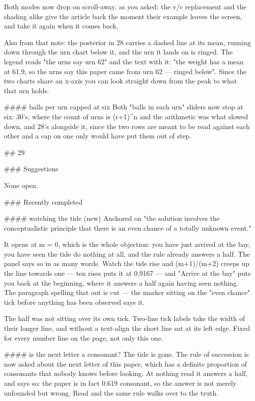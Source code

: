 Both modes now drop on scroll-away, as you asked: the v/c replacement and the
shading alike give the article back the moment their example leaves the screen,
and take it again when it comes back.

Also from that note: the posterior in 28 carries a dashed line at its mean,
running down through the urn chart below it, and the urn it lands on is ringed.
The legend reads "the urns say urn 62" and the text with it: "the weight has a
mean at 61.9, so the urns say this paper came from urn 62 — ringed below". Since
the two charts share an x-axis you can look straight down from the peak to what
that urn holds.

#### balls per urn capped at six
Both "balls in each urn" sliders now stop at six: 30's, where the count of urns
is (r+1)^n and the arithmetic was what slowed down, and 28's alongside it, since
the two rows are meant to be read against each other and a cap on one only would
have put them out of step.


## 29

### Suggestions

None open.

### Recently completed

#### watching the tide (new)
Anchored on "the solution involves the conceptualistic principle that there is
an even chance of a totally unknown event."

It opens at m = 0, which is the whole objection: you have just arrived at the
bay, you have seen the tide do nothing at all, and the rule already answers a
half. The panel says so in as many words. Watch the tide rise and (m+1)/(m+2)
creeps up the line towards one — ten rises puts it at 0.9167 — and "Arrive at
the bay" puts you back at the beginning, where it answers a half again having
seen nothing. The paragraph spelling that out is cut — the marker sitting on the
"even chance" tick before anything has been observed says it.

The half was not sitting over its own tick. Two-line tick labels take the width
of their longer line, and without a text-align the short line sat at its left
edge. Fixed for every number line on the page, not only this one.

#### is the next letter a consonant?
The tide is gone. The rule of succession is now asked about the next letter of
this paper, which has a definite proportion of consonants that nobody knows
before looking. At nothing read it answers a half, and says so: the paper is in
fact 0.619 consonant, so the answer is not merely unfounded but wrong. Read and
the same rule walks over to the truth.

